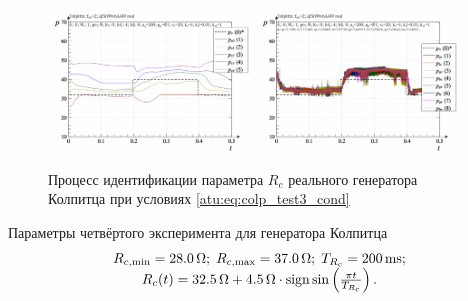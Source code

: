 \begin{figure}[htb!]
  \centerline{
    \includegraphics[width=0.48\textwidth]{p/r/colp_real_id-p_t_pi_ql3rlWvnAAW_real_d_2.png}
    \hfill
    \includegraphics[width=0.48\textwidth]{p/r/colp_real_id-p_t_p_ql3rlWvnAAW_real_d_2.png}
  }
  \caption{Процесс идентификации параметра $R_c$ реального генератора Колпитца при условиях \ref{atu:eq:colp_test3_cond} }
  \label{atu:f:colp_r_id_3}
\end{figure}



Параметры четвёртого эксперимента для генератора Колпитца
%
\begin{equation}
  \begin{array}{c}
    R_{c,\min} = \SI{28.0}{\ohm};
    \;
    R_{c,\max} = \SI{37.0}{\ohm};
    \;
    T_{R_c} = \SI{200}{\milli\second};
  \\
    R_c(t) = \SI{32.5}{\ohm} + \SI{4.5}{\ohm} \cdot \operatorname*{sign} \sin \left( \frac{\pi t}{T_{R_c}}  \right).
  \end{array}
  \label{atu:eq:colp_test4_cond}
\end{equation}

